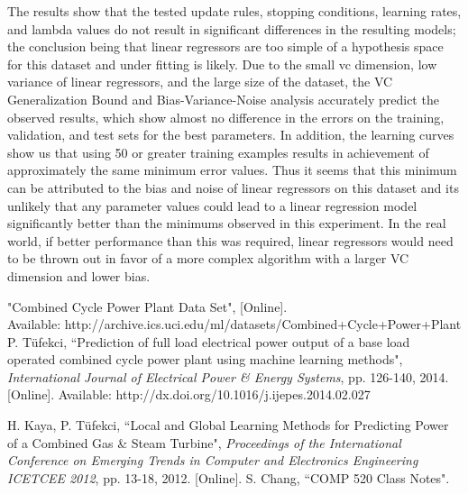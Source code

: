 \documentclass[runningheads]{llncs}
\begin{document}
The results show that the tested update rules, stopping conditions, learning rates, and lambda values do not result in significant differences in the resulting models; the conclusion being that linear regressors are too simple of a hypothesis space for this dataset and under fitting is likely. Due to the small vc dimension, low variance of linear regressors, and the large size of the dataset, the VC Generalization Bound and Bias-Variance-Noise analysis accurately predict the observed results, which show almost no difference in the errors on the training, validation, and test sets for the best parameters. In addition, the learning curves show us that using 50 or greater training examples results in achievement of approximately the same minimum error values. Thus it seems that this minimum can be attributed to the bias and noise of linear regressors on this dataset and its unlikely that any parameter values could lead to a linear regression model significantly better than the minimums observed in this experiment. In the real world, if better performance than this was required, linear regressors would need to be thrown out in favor of a more complex algorithm with a larger VC dimension and lower bias.

\begin{thebibliography}{3} %
	\addtolength{\leftmargin}{0.2in} %
	\setlength{\itemindent}{-0.2in}
	 "Combined Cycle Power Plant Data Set", [Online]. \\ Available: http://archive.ics.uci.edu/ml/datasets/Combined+Cycle+Power+Plant
	 P. Tüfekci, ``Prediction of full load electrical power output of a base load operated combined cycle power plant using machine learning methods", \emph{International Journal of Electrical Power \& Energy Systems}, pp. 126-140, 2014. [Online]. Available:  http://dx.doi.org/10.1016/j.ijepes.2014.02.027
	
	 H. Kaya, P. Tüfekci, ``Local and Global Learning Methods for Predicting Power of a Combined Gas \& Steam Turbine", \emph{Proceedings of the International Conference on Emerging Trends in Computer and Electronics Engineering ICETCEE 2012}, pp. 13-18, 2012. [Online].
	 S. Chang, ``COMP 520 Class Notes".
\end{thebibliography}
\end{document}
